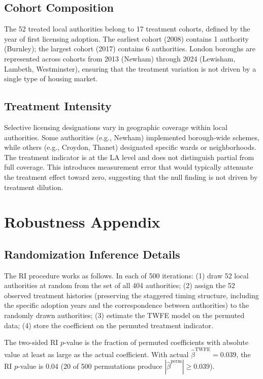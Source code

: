 \documentclass[12pt]{article}
\begin{document}
\subsection{Cohort Composition}

The 52 treated local authorities belong to 17 treatment cohorts, defined by the year of first licensing adoption. The earliest cohort (2008) contains 1 authority (Burnley); the largest cohort (2017) contains 6 authorities. London boroughs are represented across cohorts from 2013 (Newham) through 2024 (Lewisham, Lambeth, Westminster), ensuring that the treatment variation is not driven by a single type of housing market.

\subsection{Treatment Intensity}

Selective licensing designations vary in geographic coverage within local authorities. Some authorities (e.g., Newham) implemented borough-wide schemes, while others (e.g., Croydon, Thanet) designated specific wards or neighborhoods. The treatment indicator is at the LA level and does not distinguish partial from full coverage. This introduces measurement error that would typically attenuate the treatment effect toward zero, suggesting that the null finding is not driven by treatment dilution.


\section{Robustness Appendix}
\label{sec:app_robust}

\subsection{Randomization Inference Details}

The RI procedure works as follows. In each of 500 iterations: (1) draw 52 local authorities at random from the set of all 404 authorities; (2) assign the 52 observed treatment histories (preserving the staggered timing structure, including the specific adoption years and the correspondence between authorities) to the randomly drawn authorities; (3) estimate the TWFE model on the permuted data; (4) store the coefficient on the permuted treatment indicator.

The two-sided RI $p$-value is the fraction of permuted coefficients with absolute value at least as large as the actual coefficient. With actual $\hat{\beta}^{\text{TWFE}} = 0.039$, the RI $p$-value is 0.04 (20 of 500 permutations produce $|\hat{\beta}^{\text{perm}}| \geq 0.039$).
\end{document}
